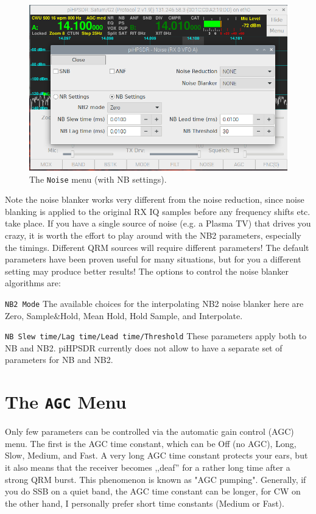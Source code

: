 \documentclass[12pt]{book}
\def\rett#1{\texttt{\color{red}#1}}
\def\bltt#1{\texttt{\color{blue}#1}}
\begin{document}
\begin{figure}[ht]
\center
\includegraphics[width=12cm]{NoiseMenu2.png}
\caption{The \bltt{Noise} menu (with NB settings).}
\label{fig:NoiseMenu2}
\end{figure}

Note the noise blanker works very different from the noise reduction, since noise blanking
is applied to the original RX IQ samples before any frequency shifts etc. take place.
If you have a single source of noise (e.g. a Plasma TV) that drives you crazy, it is worth
the effort to play around with the NB2 parameters, especially the timings. Different
QRM sources will require different parameters! The default parameters have been proven useful
for many situations, but for you a different setting may produce better results!
The options to control the noise blanker algorithms are:

\rett{NB2 Mode} The available choices for the interpolating NB2 noise blanker here are Zero,
Sample\&Hold, Mean Hold, Hold Sample, and Interpolate.

\rett{NB Slew time/Lag time/Lead time/Threshold} These parameters apply both to NB and NB2.
piHPSDR currently does not allow to have a separate set of parameters for NB and NB2.


\section{The \texttt{AGC} Menu}

Only few parameters can be controlled via the automatic gain control (AGC) menu.
The first is the AGC time constant, which can be Off (no AGC), Long, Slow, Medium,
and Fast. A very long AGC time constant protects your ears, but it also means that
the receiver becomes ,,deaf'' for a rather long time after a strong QRM burst. This
phenomenon is known as "AGC pumping". Generally, if you do SSB on a quiet band, the
AGC time constant can be longer, for CW on the other hand, I personally prefer short
time constants (Medium or Fast).
\end{document}

